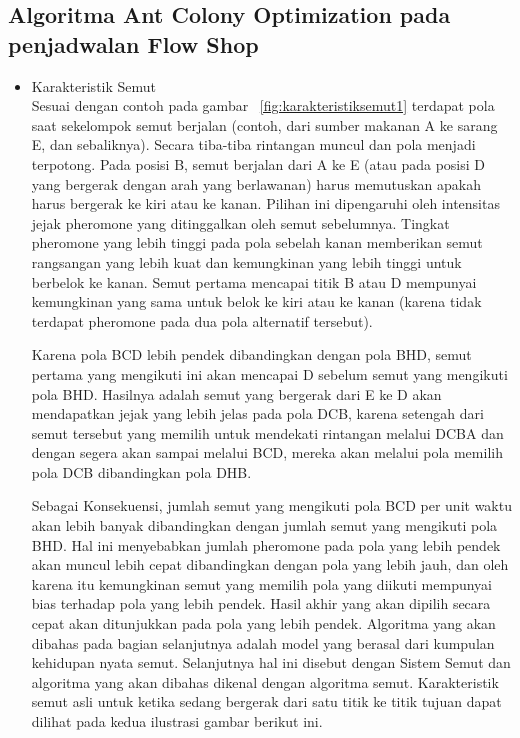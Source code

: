 \subsection{Algoritma Ant Colony Optimization pada penjadwalan Flow Shop}
\begin{itemize}
\item Karakteristik Semut \\
	Sesuai dengan contoh pada gambar ~\ref{fig:karakteristiksemut1} terdapat pola saat sekelompok semut berjalan (contoh, dari sumber makanan A ke sarang E, dan sebaliknya). Secara tiba-tiba rintangan muncul dan pola menjadi terpotong. Pada posisi B, semut berjalan dari A ke E (atau pada posisi D yang bergerak dengan arah yang berlawanan) harus memutuskan apakah harus bergerak ke kiri atau ke kanan.
	Pilihan ini dipengaruhi oleh intensitas jejak pheromone yang ditinggalkan oleh semut sebelumnya. Tingkat pheromone yang lebih tinggi pada pola sebelah kanan memberikan semut rangsangan yang lebih kuat dan kemungkinan yang lebih tinggi untuk berbelok ke kanan. Semut pertama mencapai titik B atau D mempunyai kemungkinan yang sama untuk belok ke kiri atau ke kanan (karena tidak terdapat pheromone pada dua pola alternatif tersebut).
	
	Karena pola BCD lebih pendek dibandingkan dengan pola BHD, semut pertama yang mengikuti ini akan mencapai D sebelum semut yang mengikuti pola BHD. Hasilnya adalah semut yang bergerak dari E ke D akan mendapatkan jejak yang lebih jelas pada pola DCB, karena setengah dari semut tersebut yang memilih untuk mendekati rintangan melalui DCBA dan dengan segera akan sampai melalui BCD, mereka akan melalui pola memilih pola DCB dibandingkan pola DHB. 

	Sebagai Konsekuensi, jumlah semut yang mengikuti pola BCD per unit waktu akan lebih banyak dibandingkan dengan jumlah semut yang mengikuti pola BHD.
	Hal ini menyebabkan jumlah pheromone pada pola yang lebih pendek akan muncul lebih cepat dibandingkan dengan pola yang lebih jauh, dan oleh karena itu kemungkinan semut yang memilih pola yang diikuti mempunyai bias terhadap pola yang lebih pendek. Hasil akhir yang akan dipilih secara cepat akan ditunjukkan pada pola yang lebih pendek.	
	Algoritma yang akan dibahas pada bagian selanjutnya adalah model yang berasal dari kumpulan kehidupan nyata semut. Selanjutnya hal ini disebut dengan Sistem Semut dan algoritma yang akan dibahas dikenal dengan algoritma semut. Karakteristik semut asli untuk ketika sedang bergerak dari satu titik ke titik tujuan dapat dilihat pada kedua ilustrasi gambar berikut ini.
	

\end{itemize}
